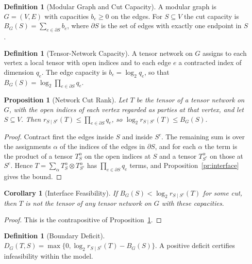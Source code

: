 \documentclass[11pt,letterpaper]{report}
\theoremstyle{plain}
\newtheorem{proposition}[theorem]{Proposition}
\newtheorem{corollary}[theorem]{Corollary}
\theoremstyle{definition}
\newtheorem{definition}[theorem]{Definition}
\theoremstyle{remark}
\begin{document}
\begin{definition}[Modular Graph and Cut Capacity]\label{def:modgraph}
A modular graph is $G=(V,E)$ with capacities $b_e\ge0$ on the edges. For $S\subseteq V$ the cut capacity is $B_G(S)=\sum_{e\in\partial S}b_e$, where $\partial S$ is the set of edges with exactly one endpoint in $S$.
\end{definition}

\begin{definition}[Tensor-Network Capacity]\label{def:tncapacity}
A tensor network on $G$ assigns to each vertex a local tensor with open indices and to each edge $e$ a contracted index of dimension $q_e$. The edge capacity is $b_e=\log_2q_e$, so that $B_G(S)=\log_2\prod_{e\in\partial S}q_e$.
\end{definition}

\begin{proposition}[Network Cut Rank]\label{pr:networkcut}
Let $T$ be the tensor of a tensor network on $G$, with the open indices of each vertex regarded as parties at that vertex, and let $S\subseteq V$. Then $r_{S\mid S^c}(T)\le\prod_{e\in\partial S}q_e$, so $\log_2r_{S\mid S^c}(T)\le B_G(S)$.
\end{proposition}
\begin{proof}
Contract first the edges inside $S$ and inside $S^c$. The remaining sum is over the assignments $\alpha$ of the indices of the edges in $\partial S$, and for each $\alpha$ the term is the product of a tensor $T_S^{\alpha}$ on the open indices at $S$ and a tensor $T_{S^c}^{\alpha}$ on those at $S^c$. Hence $T=\sum_\alpha T_S^\alpha\otimes T_{S^c}^\alpha$ has $\prod_{e\in\partial S}q_e$ terms, and Proposition~\ref{pr:interface} gives the bound.
\end{proof}

\begin{corollary}[Interface Feasibility]\label{co:feasibility}
If $B_G(S)<\log_2r_{S\mid S^c}(T)$ for some cut, then $T$ is not the tensor of any tensor network on $G$ with these capacities.
\end{corollary}
\begin{proof}
This is the contrapositive of Proposition~\ref{pr:networkcut}.
\end{proof}

\begin{definition}[Boundary Deficit]\label{def:deficit}
$D_G(T,S)=\max\{0,\log_2r_{S\mid S^c}(T)-B_G(S)\}$. A positive deficit certifies infeasibility within the model.
\end{definition}
\end{document}
